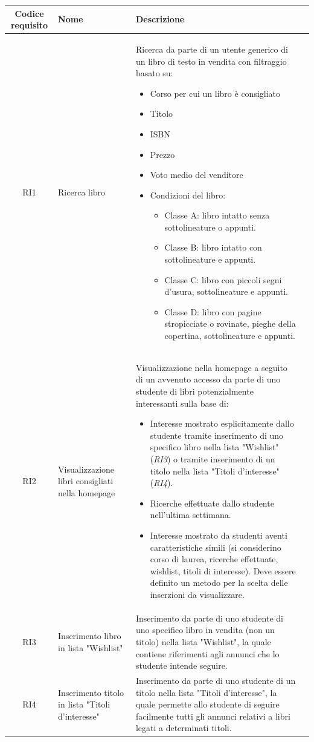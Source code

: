\documentclass[10pt,a4paper]{report}
\begin{document}
	\begin{tabular}{cp{3cm}p{9cm}p{1cm}}
		Codice requisito&Nome&Descrizione\\ \hline
		RI1&Ricerca libro&Ricerca da parte di un utente generico di un libro di testo in vendita con filtraggio basato su:
		\begin{itemize}
			\item Corso per cui un libro è consigliato
			\item Titolo
			\item ISBN
			\item Prezzo
			\item Voto medio del venditore
			\item Condizioni del libro:
			\begin{itemize}
				\item Classe A: libro intatto senza sottolineature o appunti.
				\item Classe B: libro intatto con sottolineature e appunti.
				\item Classe C: libro con piccoli segni d'usura, sottolineature e appunti.
				\item Classe D: libro con pagine stropicciate o rovinate, pieghe della copertina, sottolineature e appunti.
			\end{itemize}
			
		\end{itemize}\\ \hline
		RI2&Visualizzazione libri consigliati nella homepage&Visualizzazione nella homepage a seguito di un avvenuto accesso da parte di uno studente di libri potenzialmente interessanti sulla base di:
		\begin{itemize}
			\item Interesse mostrato esplicitamente dallo studente tramite inserimento di uno specifico libro nella lista "Wishlist" (\textit{RI3}) o tramite inserimento di un titolo nella lista "Titoli d'interesse" (\textit{RI4}).
			\item Ricerche effettuate dallo studente nell'ultima settimana.
			\item Interesse mostrato da studenti aventi caratteristiche simili (si considerino corso di laurea, ricerche effettuate, wishlist, titoli di interesse). Deve essere definito un metodo per la scelta delle inserzioni da visualizzare.
		\end{itemize}\\ \hline
		RI3&Inserimento libro in lista "Wishlist"&Inserimento da parte di uno studente di uno specifico libro in vendita (non un titolo) nella lista "Wishlist", la quale contiene riferimenti agli annunci che lo studente intende seguire.\\ \hline
		RI4&Inserimento titolo in lista "Titoli d'interesse"&Inserimento da parte di uno studente di un titolo nella lista "Titoli d'interesse", la quale permette allo studente di seguire facilmente tutti gli annunci relativi a libri legati a determinati titoli.\\ \hline
	\end{tabular}
\end{document}
